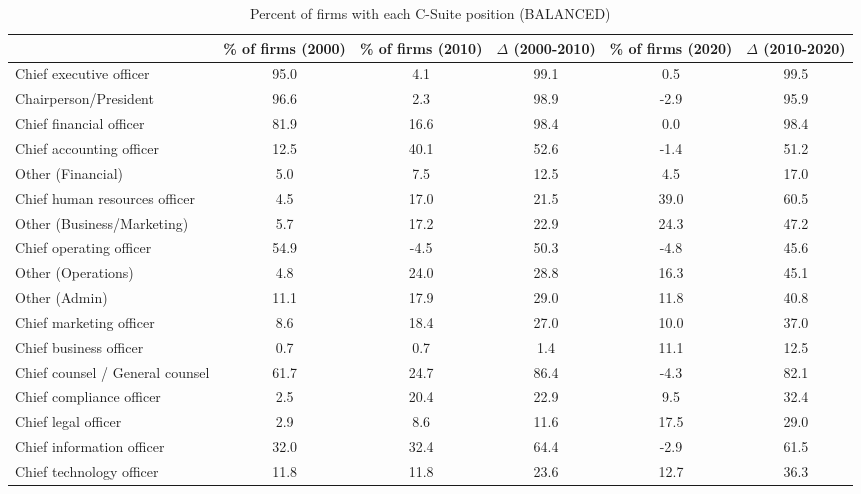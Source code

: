 \begin{table}[htbp]\centering
\caption{Percent of firms with each C-Suite position (BALANCED)\label{tab98}}
\begin{tabular}{l*{5}{c}}
\toprule
                    &\% of firms (2000)&\% of firms (2010)&$\Delta$ (2000-2010)&\% of firms (2020)&$\Delta$ (2010-2020)\\
\midrule
Chief executive officer&        95.0&         4.1&        99.1&         0.5&        99.5\\
Chairperson/President&        96.6&         2.3&        98.9&        -2.9&        95.9\\
Chief financial officer&        81.9&        16.6&        98.4&         0.0&        98.4\\
Chief accounting officer&        12.5&        40.1&        52.6&        -1.4&        51.2\\
Other (Financial)   &         5.0&         7.5&        12.5&         4.5&        17.0\\
Chief human resources officer&         4.5&        17.0&        21.5&        39.0&        60.5\\
Other (Business/Marketing)&         5.7&        17.2&        22.9&        24.3&        47.2\\
Chief operating officer&        54.9&        -4.5&        50.3&        -4.8&        45.6\\
Other (Operations)  &         4.8&        24.0&        28.8&        16.3&        45.1\\
Other (Admin)       &        11.1&        17.9&        29.0&        11.8&        40.8\\
Chief marketing officer&         8.6&        18.4&        27.0&        10.0&        37.0\\
Chief business officer&         0.7&         0.7&         1.4&        11.1&        12.5\\
Chief counsel / General counsel&        61.7&        24.7&        86.4&        -4.3&        82.1\\
Chief compliance officer&         2.5&        20.4&        22.9&         9.5&        32.4\\
Chief legal officer &         2.9&         8.6&        11.6&        17.5&        29.0\\
Chief information officer&        32.0&        32.4&        64.4&        -2.9&        61.5\\
Chief technology officer&        11.8&        11.8&        23.6&        12.7&        36.3\\

\end{tabular}
\end{table}
